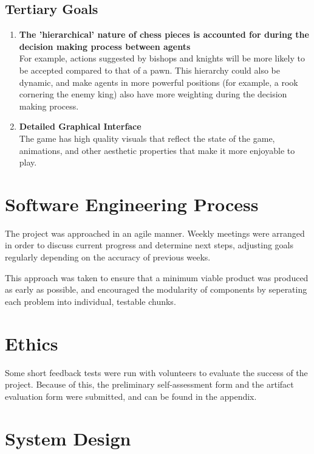 \documentclass{article}
\newcommand\descitem[1]{\item{\bfseries #1}\\}
\begin{document}
\subsection*{Tertiary Goals}

\begin{enumerate}

		\descitem{The 'hierarchical' nature of chess pieces is accounted for during the decision making process between agents}
		For example, actions suggested by bishops and knights will be more likely to be accepted compared to that of a pawn. This hierarchy could also be dynamic, and make agents in more powerful positions (for example, a rook cornering the enemy king) also have more weighting during the decision making process.

		\descitem{Detailed Graphical Interface}
		The game has high quality visuals that reflect the state of the game, animations, and other aesthetic properties that make it more enjoyable to play.

\end{enumerate}

\clearpage

\section{Software Engineering Process}

The project was approached in an agile manner. Weekly meetings were arranged in order to discuss current progress and determine next steps, adjusting goals regularly depending on the accuracy of previous weeks. 

This approach was taken to ensure that a minimum viable product was produced as early as possible, and encouraged the modularity of components by seperating each problem into individual, testable chunks. 

\section{Ethics}

Some short feedback tests were run with volunteers to evaluate the success of the project. Because of this, the preliminary self-assessment form and the artifact evaluation form were submitted, and can be found in the appendix.

\section{System Design}
\end{document}
